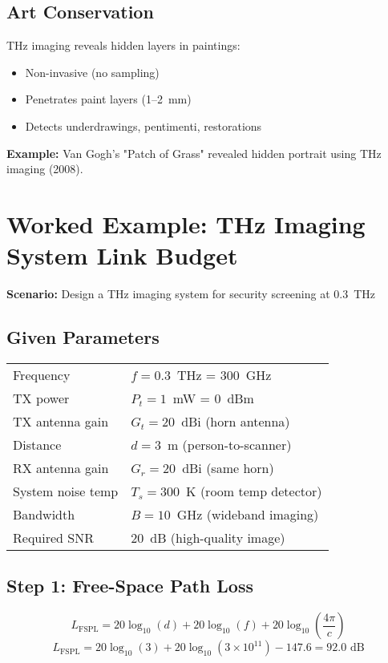 \subsection{Art Conservation}

THz imaging reveals hidden layers in paintings:
\begin{itemize}
\item Non-invasive (no sampling)
\item Penetrates paint layers (1--2~mm)
\item Detects underdrawings, pentimenti, restorations
\end{itemize}

\textbf{Example:} Van Gogh's "Patch of Grass" revealed hidden portrait using THz imaging (2008).

\section{Worked Example: THz Imaging System Link Budget}

\textbf{Scenario:} Design a THz imaging system for security screening at 0.3~THz

\subsection*{Given Parameters}

\begin{tabular}{@{}ll@{}}
Frequency & $f = 0.3$~THz = 300~GHz \\
TX power & $P_t = 1$~mW = 0~dBm \\
TX antenna gain & $G_t = 20$~dBi (horn antenna) \\
Distance & $d = 3$~m (person-to-scanner) \\
RX antenna gain & $G_r = 20$~dBi (same horn) \\
System noise temp & $T_s = 300$~K (room temp detector) \\
Bandwidth & $B = 10$~GHz (wideband imaging) \\
Required SNR & 20~dB (high-quality image) \\
\end{tabular}

\subsection*{Step 1: Free-Space Path Loss}

\begin{equation}
L_{\text{FSPL}} = 20\log_{10}(d) + 20\log_{10}(f) + 20\log_{10}\left(\frac{4\pi}{c}\right)
\end{equation}
\begin{equation}
L_{\text{FSPL}} = 20\log_{10}(3) + 20\log_{10}(3 \times 10^{11}) - 147.6 = 92.0 \text{ dB}
\end{equation}

